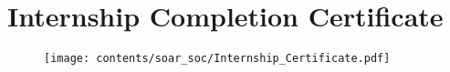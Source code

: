 \section{Internship Completion Certificate}

\begin{figure}[h!]
    \centering
    \texttt{[image: contents/soar\_soc/Internship\_Certificate.pdf]}
\end{figure}